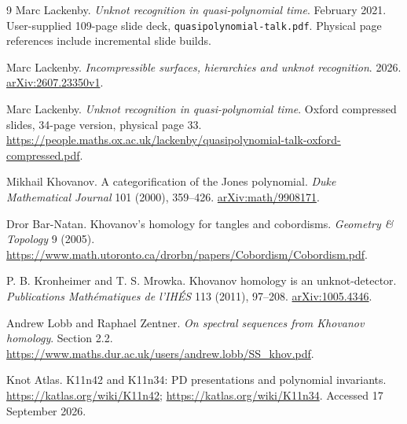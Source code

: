 \documentclass[11pt]{article}
\theoremstyle{definition}\newtheorem{definition}[theorem]{Definition}
\begin{document}
\begin{thebibliography}{9}
 Marc Lackenby.
\emph{Unknot recognition in quasi-polynomial time}.
February 2021. User-supplied 109-page slide deck,
\texttt{quasipolynomial-talk.pdf}. Physical page references include incremental
slide builds.

 Marc Lackenby.
\emph{Incompressible surfaces, hierarchies and unknot recognition}.
2026. \href{https://arxiv.org/abs/2607.23350}{arXiv:2607.23350v1}.

 Marc Lackenby.
\emph{Unknot recognition in quasi-polynomial time}. Oxford compressed slides,
34-page version, physical page 33.
\url{https://people.maths.ox.ac.uk/lackenby/quasipolynomial-talk-oxford-compressed.pdf}.

 Mikhail Khovanov.
A categorification of the Jones polynomial.
\emph{Duke Mathematical Journal} 101 (2000), 359--426.
\href{https://arxiv.org/abs/math/9908171}{arXiv:math/9908171}.

 Dror Bar-Natan.
Khovanov's homology for tangles and cobordisms.
\emph{Geometry \& Topology} 9 (2005).
\url{https://www.math.utoronto.ca/drorbn/papers/Cobordism/Cobordism.pdf}.

 P. B. Kronheimer and T. S. Mrowka.
Khovanov homology is an unknot-detector.
\emph{Publications Math\'ematiques de l'IH\'ES} 113 (2011), 97--208.
\href{https://arxiv.org/abs/1005.4346}{arXiv:1005.4346}.

 Andrew Lobb and Raphael Zentner.
\emph{On spectral sequences from Khovanov homology}. Section 2.2.
\url{https://www.maths.dur.ac.uk/users/andrew.lobb/SS_khov.pdf}.

 Knot Atlas.
K11n42 and K11n34: PD presentations and polynomial invariants.
\url{https://katlas.org/wiki/K11n42};
\url{https://katlas.org/wiki/K11n34}. Accessed 17 September 2026.
\end{thebibliography}
\end{document}
